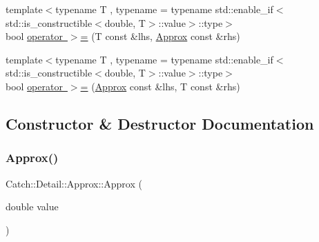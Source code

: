 \begin{DoxyCompactItemize}
\item 
{\footnotesize template$<$typename T , typename  = typename std\+::enable\+\_\+if$<$std\+::is\+\_\+constructible$<$double, T$>$\+::value$>$\+::type$>$ }\\bool \mbox{\hyperlink{class_catch_1_1_detail_1_1_approx_ae68a144dad95cfe31786d2df0b25bb02}{operator $>$=}} (T const \&lhs, \mbox{\hyperlink{class_catch_1_1_detail_1_1_approx}{Approx}} const \&rhs)
\item 
{\footnotesize template$<$typename T , typename  = typename std\+::enable\+\_\+if$<$std\+::is\+\_\+constructible$<$double, T$>$\+::value$>$\+::type$>$ }\\bool \mbox{\hyperlink{class_catch_1_1_detail_1_1_approx_aef8dca60ba535199c0703e1e3a25562b}{operator $>$=}} (\mbox{\hyperlink{class_catch_1_1_detail_1_1_approx}{Approx}} const \&lhs, T const \&rhs)
\end{DoxyCompactItemize}


\subsection{Constructor \& Destructor Documentation}
\mbox{\label{class_catch_1_1_detail_1_1_approx_a1a8618ea8db08c66bd3d9fe8f74b957a}} 
\subsubsection{\texorpdfstring{Approx()}{Approx()}\hspace{0.1cm}{\footnotesize\ttfamily [1/2]}}
{\footnotesize\ttfamily Catch\+::\+Detail\+::\+Approx\+::\+Approx (\begin{DoxyParamCaption}\item[{double}]{value }\end{DoxyParamCaption})\hspace{0.3cm}{\ttfamily [explicit]}}

\mbox{\label{class_catch_1_1_detail_1_1_approx_ab14b979fa8a37f21d037157fabed4072}} 
